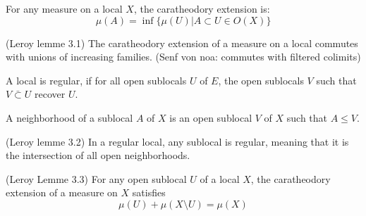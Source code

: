 \begin{definition}[Caratheodory]
    \leanok
    \label{def:caratheodory}
    For any measure on a local $X$, the caratheodory extension is:
    \[\mu(A) = \inf \{\mu(U) | A \subset U \in O(X)\}\]
\end{definition}

\begin{lemma}
(Leroy lemme 3.1)
    \label{lem:commutes_with_sup}
    The caratheodory extension of a measure on a local commutes with unions of increasing families.
    (Senf von noa: commutes with filtered colimits)
\end{lemma}



\begin{definition}
    \label{def:regular_local}
    \leanok
    A local is regular, if for all open sublocals $U$ of $E$, the open sublocals $V$ such that $V\bar \subset U$ recover $U$.
\end{definition}



\begin{definition}[Neighborhood]
    \label{def:neighborhood}
    \leanok

    A neighborhood of a sublocal $A$ of $X$ is an open sublocal $V$ of $X$ such that $A \le V$.
\end{definition}

\begin{lemma}
(Leroy lemme 3.2)
    \label{lem:regularity_of_sublocals}
    In a regular local, any sublocal is regular, meaning that it is the intersection of all open neighborhoods.
\end{lemma}


\begin{lemma}[Property 1]
(Leroy Lemme 3.3)
    \label{lem:property_1}
    For any open sublocal $U$ of a local $X$, the caratheodory extension of a measure on $X$ satisfies \[\mu(U) + \mu(X \setminus U) = \mu(X)\]
\end{lemma}



